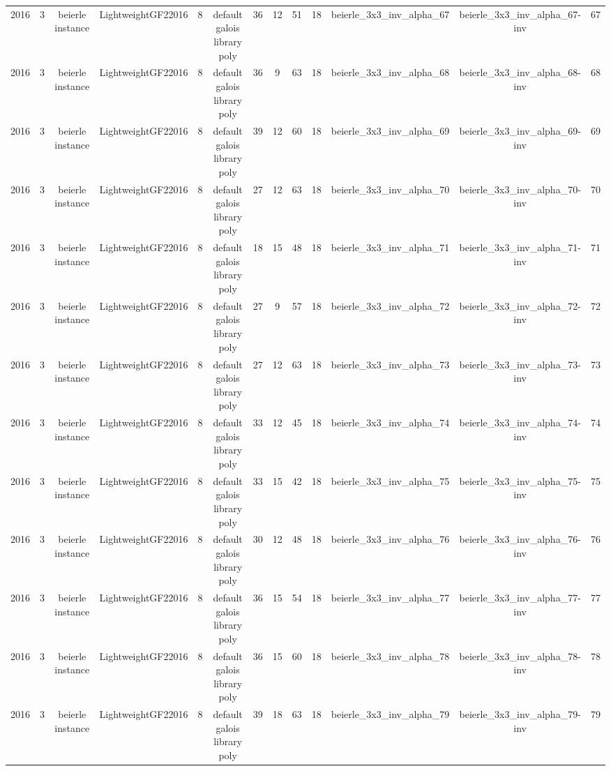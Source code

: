 \begin{tabular}{c c c c c c c c c c c c c}
2016 & 3 & beierle instance & LightweightGF22016 & 8 & default galois library poly & 36 & 12 & 51 & 18 & beierle_3x3_inv_alpha_67 & beierle_3x3_inv_alpha_67-inv & 67 \\
2016 & 3 & beierle instance & LightweightGF22016 & 8 & default galois library poly & 36 & 9 & 63 & 18 & beierle_3x3_inv_alpha_68 & beierle_3x3_inv_alpha_68-inv & 68 \\
2016 & 3 & beierle instance & LightweightGF22016 & 8 & default galois library poly & 39 & 12 & 60 & 18 & beierle_3x3_inv_alpha_69 & beierle_3x3_inv_alpha_69-inv & 69 \\
2016 & 3 & beierle instance & LightweightGF22016 & 8 & default galois library poly & 27 & 12 & 63 & 18 & beierle_3x3_inv_alpha_70 & beierle_3x3_inv_alpha_70-inv & 70 \\
2016 & 3 & beierle instance & LightweightGF22016 & 8 & default galois library poly & 18 & 15 & 48 & 18 & beierle_3x3_inv_alpha_71 & beierle_3x3_inv_alpha_71-inv & 71 \\
2016 & 3 & beierle instance & LightweightGF22016 & 8 & default galois library poly & 27 & 9 & 57 & 18 & beierle_3x3_inv_alpha_72 & beierle_3x3_inv_alpha_72-inv & 72 \\
2016 & 3 & beierle instance & LightweightGF22016 & 8 & default galois library poly & 27 & 12 & 63 & 18 & beierle_3x3_inv_alpha_73 & beierle_3x3_inv_alpha_73-inv & 73 \\
2016 & 3 & beierle instance & LightweightGF22016 & 8 & default galois library poly & 33 & 12 & 45 & 18 & beierle_3x3_inv_alpha_74 & beierle_3x3_inv_alpha_74-inv & 74 \\
2016 & 3 & beierle instance & LightweightGF22016 & 8 & default galois library poly & 33 & 15 & 42 & 18 & beierle_3x3_inv_alpha_75 & beierle_3x3_inv_alpha_75-inv & 75 \\
2016 & 3 & beierle instance & LightweightGF22016 & 8 & default galois library poly & 30 & 12 & 48 & 18 & beierle_3x3_inv_alpha_76 & beierle_3x3_inv_alpha_76-inv & 76 \\
2016 & 3 & beierle instance & LightweightGF22016 & 8 & default galois library poly & 36 & 15 & 54 & 18 & beierle_3x3_inv_alpha_77 & beierle_3x3_inv_alpha_77-inv & 77 \\
2016 & 3 & beierle instance & LightweightGF22016 & 8 & default galois library poly & 36 & 15 & 60 & 18 & beierle_3x3_inv_alpha_78 & beierle_3x3_inv_alpha_78-inv & 78 \\
2016 & 3 & beierle instance & LightweightGF22016 & 8 & default galois library poly & 39 & 18 & 63 & 18 & beierle_3x3_inv_alpha_79 & beierle_3x3_inv_alpha_79-inv & 79 \\

\end{tabular}
